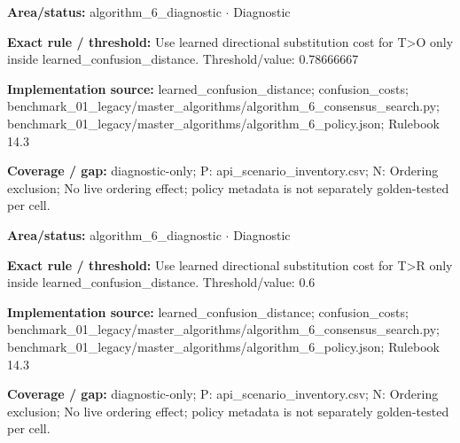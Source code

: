 \begin{tcolorbox}[enhanced,breakable,colback=white,colframe=Muted!45,boxrule=0.45pt,arc=1.5pt,left=6pt,right=6pt,top=5pt,bottom=5pt,title={\texttt{A6-LEARNED-SUBSTITUTION-T-O}},title after break={\texttt{A6-LEARNED-SUBSTITUTION-T-O}\ (continued)},fonttitle=\headingfont\bfseries\color{Navy},coltitle=Navy]
\textbf{Area/status:} algorithm\_\allowbreak{}6\_\allowbreak{}diagnostic $\boldsymbol{\cdot}$ Diagnostic\par
\smallskip
\textbf{Exact rule / threshold:} Use learned directional substitution cost for T>O only inside learned\_\allowbreak{}confusion\_\allowbreak{}distance. Threshold/\allowbreak{}value: 0.78666667\par
\smallskip
\textbf{Implementation source:} learned\_\allowbreak{}confusion\_\allowbreak{}distance; confusion\_\allowbreak{}costs; benchmark\_\allowbreak{}01\_\allowbreak{}legacy/\allowbreak{}master\_\allowbreak{}algorithms/\allowbreak{}algorithm\_\allowbreak{}6\_\allowbreak{}consensus\_\allowbreak{}search.py; benchmark\_\allowbreak{}01\_\allowbreak{}legacy/\allowbreak{}master\_\allowbreak{}algorithms/\allowbreak{}algorithm\_\allowbreak{}6\_\allowbreak{}policy.json; Rulebook 14.3\par
\smallskip
\textbf{Coverage / gap:} diagnostic-only; P: api\_\allowbreak{}scenario\_\allowbreak{}inventory.csv; N: Ordering exclusion; No live ordering effect; policy metadata is not separately golden-tested per cell.
\end{tcolorbox}
\begin{tcolorbox}[enhanced,breakable,colback=white,colframe=Muted!45,boxrule=0.45pt,arc=1.5pt,left=6pt,right=6pt,top=5pt,bottom=5pt,title={\texttt{A6-LEARNED-SUBSTITUTION-T-R}},title after break={\texttt{A6-LEARNED-SUBSTITUTION-T-R}\ (continued)},fonttitle=\headingfont\bfseries\color{Navy},coltitle=Navy]
\textbf{Area/status:} algorithm\_\allowbreak{}6\_\allowbreak{}diagnostic $\boldsymbol{\cdot}$ Diagnostic\par
\smallskip
\textbf{Exact rule / threshold:} Use learned directional substitution cost for T>R only inside learned\_\allowbreak{}confusion\_\allowbreak{}distance. Threshold/\allowbreak{}value: 0.6\par
\smallskip
\textbf{Implementation source:} learned\_\allowbreak{}confusion\_\allowbreak{}distance; confusion\_\allowbreak{}costs; benchmark\_\allowbreak{}01\_\allowbreak{}legacy/\allowbreak{}master\_\allowbreak{}algorithms/\allowbreak{}algorithm\_\allowbreak{}6\_\allowbreak{}consensus\_\allowbreak{}search.py; benchmark\_\allowbreak{}01\_\allowbreak{}legacy/\allowbreak{}master\_\allowbreak{}algorithms/\allowbreak{}algorithm\_\allowbreak{}6\_\allowbreak{}policy.json; Rulebook 14.3\par
\smallskip
\textbf{Coverage / gap:} diagnostic-only; P: api\_\allowbreak{}scenario\_\allowbreak{}inventory.csv; N: Ordering exclusion; No live ordering effect; policy metadata is not separately golden-tested per cell.
\end{tcolorbox}
